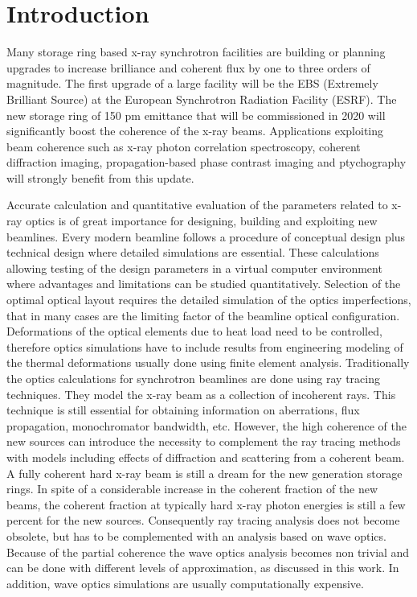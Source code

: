\documentclass{iucr}              %
\begin{document}
     
\section{Introduction}


Many storage ring based x-ray synchrotron facilities are building or planning upgrades to increase brilliance and coherent flux by one to three orders of magnitude.  The first upgrade of a large facility will be the EBS (Extremely Brilliant Source) \cite{orangebook} at the European Synchrotron Radiation Facility (ESRF). The new storage ring of 150 pm emittance that will be commissioned in 2020 will significantly boost the coherence of the x-ray beams. Applications exploiting beam coherence such as x-ray photon correlation spectroscopy, coherent diffraction imaging, propagation-based phase contrast imaging and ptychography will strongly benefit from this update.  

Accurate calculation and quantitative evaluation of the parameters related to x-ray optics is of great importance for designing, building and exploiting new beamlines. Every modern beamline follows a procedure of conceptual design plus technical design where detailed simulations are essential. These calculations  allowing testing of the design parameters in a virtual computer environment where advantages and limitations can be studied quantitatively. Selection of the optimal optical layout requires the detailed simulation of the optics imperfections, that in many cases are the limiting factor of the beamline optical configuration. Deformations of the optical elements due to heat load need to be controlled, therefore optics simulations have to include results from engineering modeling of the thermal deformations usually done using finite element analysis. Traditionally the optics calculations for synchrotron beamlines are done using ray tracing techniques. They model the x-ray beam as a collection of incoherent rays. This technique is still essential for obtaining information on aberrations, flux propagation, monochromator bandwidth, etc. However, the high coherence of the new sources can introduce the necessity to complement the ray tracing methods with models including effects of diffraction and scattering from a coherent beam. A fully coherent hard x-ray beam is still a dream for the new generation storage rings. In spite of a considerable increase in the coherent fraction of the new beams, the coherent fraction at typically hard x-ray photon energies is still a few percent for the new sources. Consequently ray tracing analysis does not become obsolete, but has to be complemented with an analysis based on wave optics. Because of the partial coherence the wave optics analysis becomes non trivial and can be done with different levels of approximation, as discussed in this work. In addition, wave optics simulations are usually computationally expensive.
\end{document}
